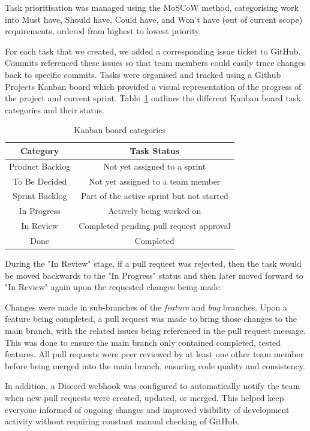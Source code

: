 \documentclass{vgtc}                          %
\begin{document}
Task prioritisation was managed using the MoSCoW method, categorising work into Must have, Should have, Could have, and Won't have (out of current scope) requirements, ordered from highest to lowest priority.

For each task that we created, we added a corresponding issue ticket to GitHub. Commits referenced these issues so that team members could easily trace changes back to specific commits. Tasks were organised and tracked using a Github Projects Kanban board which provided a visual representation of the progress of the project and current sprint. Table~\ref{tab:kanban} outlines the different Kanban board task categories and their status.

\begin{table}[htbp]
    \centering
    \begin{tabular}{|c|c|}
        \hline
        Category & 
        Task Status \\
        \hline
        Product Backlog & Not yet assigned to a sprint \\
        To Be Decided & Not yet assigned to a team member \\
        Sprint Backlog & Part of the active sprint but not started \\
        In Progress & Actively being worked on \\
        In Review & Completed pending pull request approval \\
        Done & Completed \\
        \hline
    \end{tabular}
    \caption{Kanban board categories}
    \label{tab:kanban}
\end{table}

During the "In Review" stage, if a pull request was rejected, then the task would be moved backwards to the "In Progress" status and then later moved forward to "In Review" again upon the requested changes being made.

Changes were made in sub-branches of the \textit{feature} and \textit{bug} branches. Upon a feature being completed, a pull request was made to bring those changes to the main branch, with the related issues being referenced in the pull request message. This was done to ensure the main branch only contained completed, tested features. All pull requests were peer reviewed by at least one other team member before being merged into the main branch, ensuring code quality and consistency.

In addition, a Discord webhook was configured to automatically notify the team when new pull requests were created, updated, or merged. This helped keep everyone informed of ongoing changes and improved visibility of development activity without requiring constant manual checking of GitHub.
\end{document}
